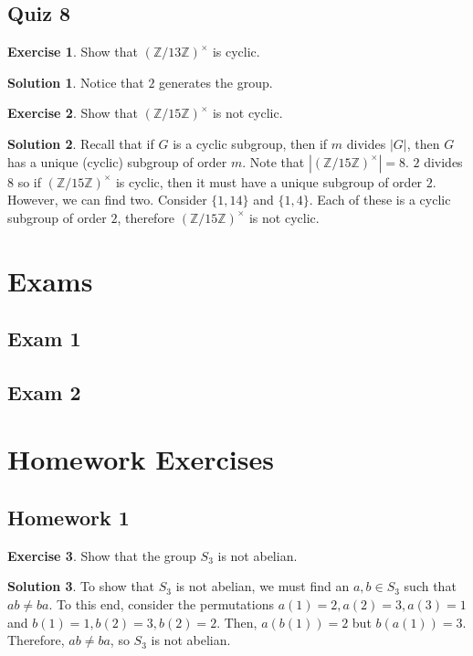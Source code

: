 \documentclass[12pt]{article}
\theoremstyle{definition}
\newcommand{\Z}{\mathbb{Z}}
\newtheorem{exercise}{\color{YellowOrange}Exercise}
\theoremstyle{definition}
\newtheorem{solution}{\color{Goldenrod}Solution}
\begin{document}
\subsection{Quiz 8}
\begin{exercise}
	Show that $(\Z/13 \Z)^{\times}$ is cyclic. 
\end{exercise}
\begin{solution}
	Notice that $2$ generates the group. 
\end{solution}

\begin{exercise}
	Show that $(\Z/15 \Z)^{\times}$ is not cyclic. 
\end{exercise}
\begin{solution}
	Recall that if $G$ is a cyclic subgroup, then if $m$ divides $|G|$, then $G$ has a unique (cyclic) subgroup of order $m$. Note that $|(\Z/15 \Z)^{\times}| = 8$. $2$ divides $8$ so if $(\Z/15 \Z)^{\times}$ is cyclic, then it must have a unique subgroup of order $2$. However, we can find two. Consider $\{1,14\}$ and $\{1,4\}$. Each of these is a cyclic subgroup of order $2$, therefore $(\Z/15 \Z)^{\times}$ is not cyclic. 
\end{solution}

\section{Exams}
\subsection{Exam 1}

\subsection{Exam 2}


\section{Homework Exercises}
\subsection{Homework 1}
\begin{exercise}
Show that the group $S_3$ is not abelian. 
\end{exercise}
\begin{solution}
To show that $S_3$ is not abelian, we must find an $a,b \in S_3$ such that $ab \neq ba$. To this end, consider the permutations $a(1) = 2, a(2) = 3, a(3) = 1$ and $b(1) = 1, b(2) = 3, b(2) = 2.$ Then, $a(b(1))= 2$ but $b(a(1)) = 3$. Therefore, $ab \neq ba$, so $S_3$ is not abelian.
\end{solution}
\end{document}

